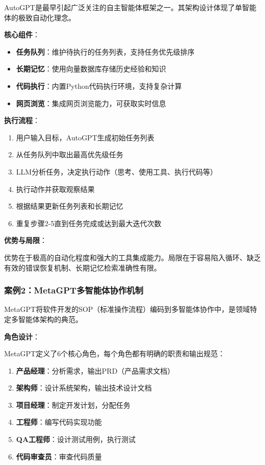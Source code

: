 AutoGPT是最早引起广泛关注的自主智能体框架之一。其架构设计体现了单智能体的极致自动化理念。

\textbf{核心组件}：
\begin{itemize}[leftmargin=2em]
    \item \textbf{任务队列}：维护待执行的任务列表，支持任务优先级排序
    \item \textbf{长期记忆}：使用向量数据库存储历史经验和知识
    \item \textbf{代码执行}：内置Python代码执行环境，支持复杂计算
    \item \textbf{网页浏览}：集成网页浏览能力，可获取实时信息
\end{itemize}

\textbf{执行流程}：
\begin{enumerate}[leftmargin=2em]
    \item 用户输入目标，AutoGPT生成初始任务列表
    \item 从任务队列中取出最高优先级任务
    \item LLM分析任务，决定执行动作（思考、使用工具、执行代码等）
    \item 执行动作并获取观察结果
    \item 根据结果更新任务列表和长期记忆
    \item 重复步骤2-5直到任务完成或达到最大迭代次数
\end{enumerate}

\textbf{优势与局限}：

优势在于极高的自动化程度和强大的工具集成能力。局限在于容易陷入循环、缺乏有效的错误恢复机制、长期记忆检索准确性有限。

\subsubsection{案例2：MetaGPT多智能体协作机制}

MetaGPT将软件开发的SOP（标准操作流程）编码到多智能体协作中，是领域特定多智能体架构的典范。

\textbf{角色设计}：

MetaGPT定义了6个核心角色，每个角色都有明确的职责和输出规范：
\begin{enumerate}[leftmargin=2em]
    \item \textbf{产品经理}：分析需求，输出PRD（产品需求文档）
    \item \textbf{架构师}：设计系统架构，输出技术设计文档
    \item \textbf{项目经理}：制定开发计划，分配任务
    \item \textbf{工程师}：编写代码实现功能
    \item \textbf{QA工程师}：设计测试用例，执行测试
    \item \textbf{代码审查员}：审查代码质量
\end{enumerate}

